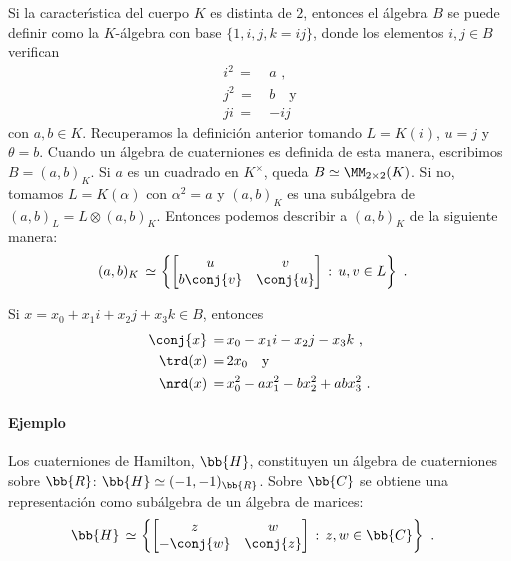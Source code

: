 Si la caracter\'{\i}stica del cuerpo $K$ es distinta de $2$, entonces
el \'{a}lgebra $B$ se puede definir como la $K$-\'{a}lgebra con base
$\{1,i,j,k=ij\}$, donde los elementos $i,j\in B$ verifican
\begin{align*}
 i^{2} \,=\, & a \text{ ,} \\
 j^{2} \,=\, & b \quad\text{y} \\
 ji \,=\, & -ij
\end{align*}
%
con $a,b\in K$. Recuperamos la definici\'{o}n anterior tomando
$L=K(i)$, $u=j$ y $\theta=b$. Cuando un \'{a}lgebra de cuaterniones
es definida de esta manera, escribimos $B=(a,b)_{K}$.
Si $a$ es un cuadrado en $K^{\times}$, queda $B\simeq\MM_{2\times 2}(K)$.
Si no, tomamos $L=K(\alpha)$ con $\alpha^{2}=a$ y $(a,b)_{K}$ es
una sub\'{a}lgebra de $(a,b)_{L}=L\otimes (a,b)_{K}$. Entonces podemos
describir a $(a,b)_{K}$ de la siguiente manera:
\begin{align*}
 (a,b)_{K} \,\simeq\, & \left\lbrace \begin{bmatrix} u & v \\
					b\conj{v} & \conj{u} \end{bmatrix}
	\,:\, u,v\in L\right\rbrace
	\text{ .}
\end{align*}
%

Si $x=x_{0}+x_{1}i+x_{2}j+x_{3}k\in B$, entonces
\begin{align*}
 \conj{x} \,=\, & x_{0} - x_{1} i - x_{2} j - x_{3} k \text{ ,} \\
 \trd(x) \,=\, & 2x_{0} \quad\text{y} \\
 \nrd(x) \,=\, & x_{0}^{2} - a x_{1}^{2} - b x_{2}^{2} + ab x_{3}^{2}
 \text{ .}
\end{align*}
%

\paragraph{Ejemplo}
Los cuaterniones de Hamilton, $\bb{H}$, constituyen un \'{a}lgebra de
cuaterniones sobre $\bb{R}$: $\bb{H}\simeq (-1,-1)_{\bb{R}}$. Sobre $\bb{C}$
se obtiene una representaci\'{o}n como sub\'{a}lgebra de un \'{a}lgebra de
marices:
\begin{align*}
 \bb{H}\,\simeq\, & \left\lbrace \begin{bmatrix} z & w \\
					-\conj{w} & \conj{z} \end{bmatrix}
	\,:\,z,w\in\bb{C}\right\rbrace\text{ .}
\end{align*}
%

